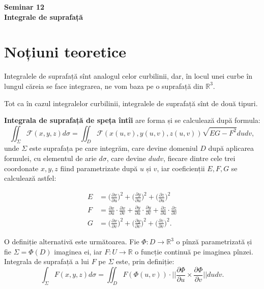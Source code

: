 \documentclass[11pt,a4paper]{article}
\newcommand\RR{\mathbb{R}}
\theoremstyle{dotless}
\theoremstyle{dotlessdr}
\begin{document}
\begin{center}
  {\large\textbf{Seminar 12 \\
      Integrale de suprafață}}
\end{center}

\vspace{1cm}

\section{Noțiuni teoretice}
\label{sec:teorie}

Integralele de suprafață sînt analogul celor curbilinii, dar, în locul unei curbe
în lungul căreia se face integrarea, ne vom baza pe o suprafață din $\RR^3$.

Tot ca în cazul integralelor curbilinii, integralele de suprafață sînt de două tipuri.

\textbf{Integrala de suprafață de speța întîi} are forma și se calculează după formula:
\[
  \iint_\Sigma \mathcal{F}(x, y, z) d\sigma =
  \iint_D \mathcal{F}(x(u,v), y(u,v), z(u,v)) \sqrt{EG - F^2} dudv,
\]
unde $\Sigma$ este suprafața pe care integrăm, care devine domeniul $D$ după aplicarea
formulei, cu elementul de arie $d \sigma$, care devine $dudv$, fiecare dintre cele trei
coordonate $x, y, z$ fiind parametrizate după $u$ și $v$, iar coeficienții $E, F, G$
se calculează astfel:

\begin{align*}
  E &= \Big( \frac{\partial x}{\partial u} \Big)^2 + \Big(\frac{\partial y}{\partial u}\Big)^2 +
      \Big(\frac{\partial z}{\partial u}\Big)^2 \\
  F &= \frac{\partial x}{\partial u} \cdot \frac{\partial x}{\partial v} +
      \frac{\partial y}{\partial u} \cdot \frac{\partial y}{\partial v} +
      \frac{\partial z}{\partial u} \cdot \frac{\partial z}{\partial v} \\
  G &= \Big(\frac{\partial x}{\partial v} \Big)^2 + \Big(\frac{\partial y}{\partial v}\Big)^2 +
      \Big(\frac{\partial z}{\partial v} \Big)^2.
\end{align*}

O definiție alternativă este următoarea. Fie $\Phi : D \to \RR^3$ o pînză parametrizată
și fie $\Sigma = \Phi(D)$ imaginea ei, iar $F : U \to \RR$ o funcție continuă pe
imaginea pînzei. Integrala de suprafață a lui $F$ pe $\Sigma$ este, prin definiție:
\[
  \int_\Sigma F(x, y, z) d \sigma =
  \iint_D F(\Phi(u, v)) \cdot \Big|\Big| \frac{\partial \Phi}{\partial u} \times %
  \frac{\partial \Phi}{\partial v} \Big|\Big| dudv.
\]
\end{document}
